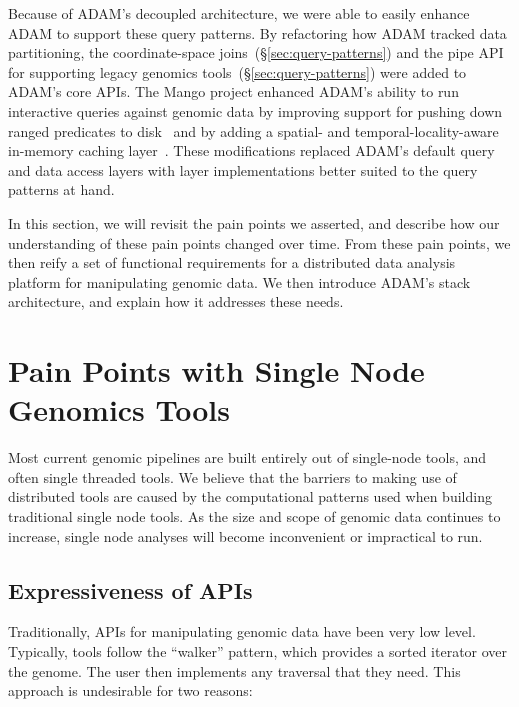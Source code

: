 \documentclass[phd]{ucbthesis}
\begin{document}
Because of {ADAM}'s decoupled architecture, we were able to easily
enhance {ADAM} to support these query patterns. By refactoring how
{ADAM} tracked data partitioning, the coordinate-space
joins~(\S\ref{sec:query-patterns}) and the {pipe} API for supporting
legacy genomics tools~(\S\ref{sec:query-patterns}) were added to {ADAM}'s
core APIs. The {Mango} project enhanced {ADAM}'s ability to run
interactive queries against genomic data by improving support for pushing down
ranged predicates to disk~\cite{tu16} and by adding a spatial- and
temporal-locality-aware in-memory caching layer~\cite{morrow17}. These modifications
replaced {ADAM}'s default query and data access layers with layer
implementations better suited to the query patterns at hand.

In this section, we will revisit the pain points we asserted, and describe
how our understanding of these pain points changed over time. From these pain
points, we then reify a set of functional requirements for a distributed data
analysis platform for manipulating genomic data. We then introduce
{ADAM}'s stack architecture, and explain how it addresses these needs.

\section{Pain Points with Single Node Genomics Tools}
\label{sec:pain-points}

Most current genomic pipelines are built entirely out of single-node tools,
and often single threaded tools. We believe that the barriers to making
use of distributed tools are caused by the computational patterns used when
building traditional single node tools. As the size and scope of genomic data
continues to increase, single node analyses will become inconvenient or
impractical to run.

\subsection{Expressiveness of APIs}
\label{sec:api-levels}

Traditionally, APIs for manipulating genomic data have been very low level.
Typically, tools follow the ``walker'' pattern, which provides a sorted
iterator over the genome. The user then implements any traversal that they need.
This approach is undesirable for two reasons:
\end{document}
